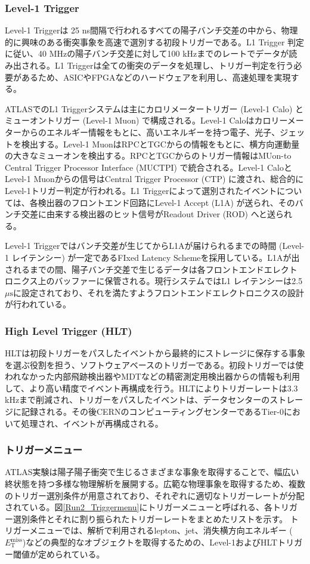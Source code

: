     \subsubsection{Level-1 Trigger}
    \baselineskip
    Level-1 Triggerは 25 ns間隔で行われるすべての陽子バンチ交差の中から、物理的に興味のある衝突事象を高速で選別する初段トリガーである。L1 Trigger 判定に従い、40 MHzの陽子バンチ交差に対して100 kHzまでのレートでデータが読み出される。L1 Triggerは全ての衝突のデータを処理し、トリガー判定を行う必要があるため、ASICやFPGAなどのハードウェアを利用し、高速処理を実現する。

    ATLASでのL1 Triggerシステムは主にカロリメータートリガー (Level-1 Calo) と ミューオントリガー (Level-1 Muon) で構成される。Level-1 Caloはカロリーメーターからのエネルギー情報をもとに、高いエネルギーを持つ電子、光子、ジェットを検出する。Level-1 MuonはRPCとTGCからの情報をもとに、横方向運動量の大きなミューオンを検出する。RPCとTGCからのトリガー情報はMUon-to Central Trigger Processor Interface (MUCTPI) で統合される。Level-1 CaloとLevel-1 Muonからの信号はCentral Trigger Processor (CTP) に渡され、総合的にLevel-1トリガー判定が行われる。L1 Triggerによって選別されたイベントについては、各検出器のフロントエンド回路にLevel-1 Accept (L1A) が送られ、そのバンチ交差に由来する検出器のヒット信号がReadout Driver (ROD) へと送られる。

    Level-1 Triggerではバンチ交差が生じてからL1Aが届けられるまでの時間 (Level-1 レイテンシー) が一定であるFIxed Latency Schemeを採用している。L1Aが出されるまでの間、陽子バンチ交差で生じるデータは各フロントエンドエレクトロニクス上のバッファーに保管される。現行システムではL1 レイテンシーは2.5 $\mu\mathrm{s}$に設定されており、それを満たすようフロントエンドエレクトロニクスの設計が行われている。

    \subsubsection*{High Level Trigger (HLT) }
    \baselineskip
    HLTは初段トリガーをパスしたイベントから最終的にストレージに保存する事象を選ぶ役割を担う、ソフトウェアベースのトリガーである。初段トリガーでは使われなかった内部飛跡検出器やMDTなどの精密測定用検出器からの情報も利用して、より高い精度でイベント再構成を行う。HLTによりトリガーレートは3.3 kHzまで削減され、トリガーをパスしたイベントは、データセンターのストレージに記録される。その後CERNのコンピューティングセンターであるTier-0において処理され、イベントが再構成される。

    \subsubsection*{トリガーメニュー}
    ATLAS実験は陽子陽子衝突で生じるさまざまな事象を取得することで、幅広い終状態を持つ多様な物理解析を展開する。広範な物理事象を取得するため、複数のトリガー選別条件が用意されており、それぞれに適切なトリガーレートが分配されている。図\ref{Run2_Triggermenu}にトリガーメニューと呼ばれる、各トリガー選別条件とそれに割り振られたトリガーレートをまとめたリストを示す。
    トリガーメニューでは、解析で利用されるlepton、jet、消失横方向エネルギー ($E_\mathrm{T}^{\mathrm{miss}}$)などの典型的なオブジェクトを取得するための、Level-1およびHLTトリガー閾値が定められている。

